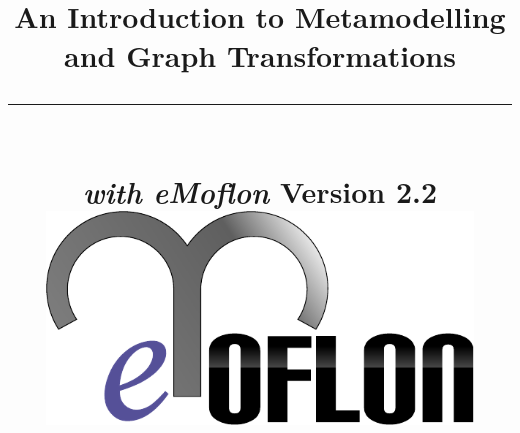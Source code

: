 \title{
\flushright
{\LARGE\bfseries An Introduction to Metamodelling\\
and Graph Transformations}
\noindent\rule[-1ex]{\textwidth}{5pt}\\[2.5ex]
\hfill\emph{\LARGE\bfseries with eMoflon}
\flushleft
{\small Version 2.2}
\flushright
\includegraphics[width=0.85\textwidth]{pics/eMoflon3} 
}

\date{}  
\author{} 